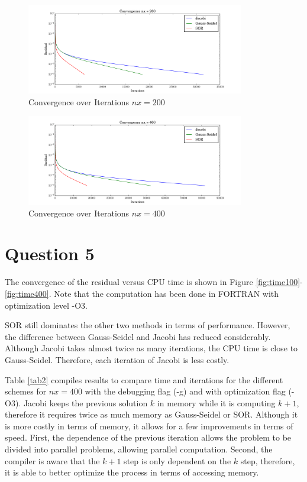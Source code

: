 \documentclass[letterpaper,12pt,]{article}
\begin{document}
\begin{figure}[!h]
    \centering
    \includegraphics[width = 0.85\textwidth]{./Figures/Conv200.pdf}
    \caption{Convergence over Iterations $nx = 200$}
    \label{fig:conv200}
\end{figure}
\begin{figure}[!h]
    \centering
    \includegraphics[width = 0.85\textwidth]{./Figures/Conv400.pdf}
    \caption{Convergence over Iterations $nx = 400$}
    \label{fig:conv400}
\end{figure}
\section*{Question 5}

The convergence of the residual versus CPU time is shown in Figure \ref{fig:time100}-\ref{fig:time400}. Note that the computation has been done in FORTRAN with optimization level -O3.

SOR still dominates the other two methods in terms of performance.
However, the difference between Gauss-Seidel and Jacobi has reduced considerably. 
Although Jacobi takes almost twice as many iterations, the CPU time is close to Gauss-Seidel. 
Therefore, each iteration of Jacobi is less costly.

Table \ref{tab2} compiles results to compare time and iterations for the different schemes for $nx = 400$ with the debugging flag (-g) and with optimization flag (-O3).
Jacobi keeps the previous solution $k$ in memory while it is computing $k+1$, therefore it requires twice as much memory as Gauss-Seidel or SOR.
Although it is more costly in terms of memory, it allows for a few improvements in terms of speed.
First, the dependence of the previous iteration allows the problem to be divided into parallel problems, allowing parallel computation.
Second, the compiler is aware that the $k+1$ step is only dependent on the $k$ step, therefore, it is able to better optimize the process in terms of accessing memory.
\end{document}
